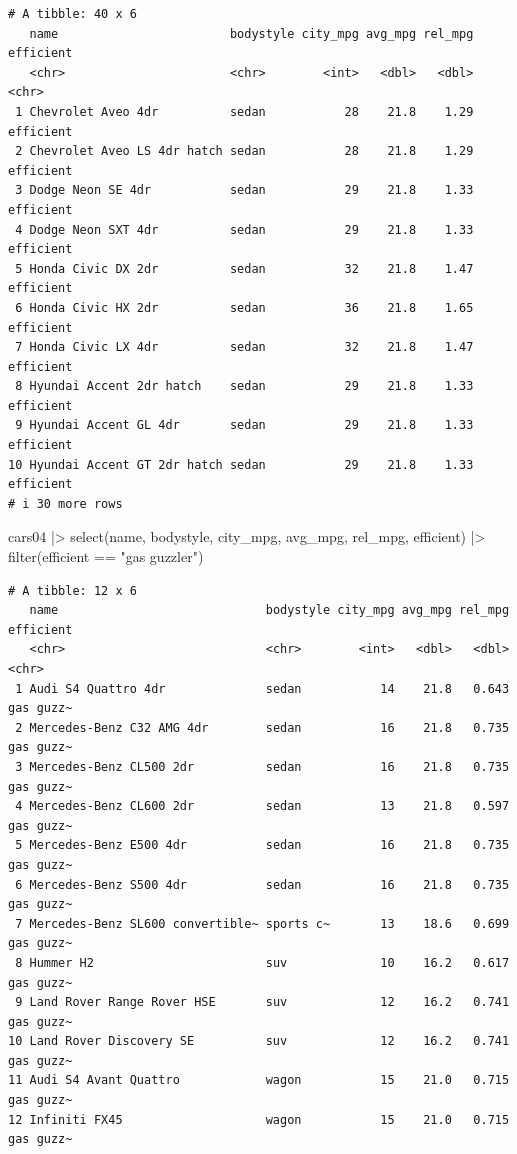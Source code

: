 \documentclass[
  letterpaper,
]{book}
\newenvironment{Shaded}{\begin{snugshade}}{\end{snugshade}}
\newcommand{\FunctionTok}[1]{\textcolor[rgb]{0.28,0.35,0.67}{#1}}
\newcommand{\NormalTok}[1]{\textcolor[rgb]{0.00,0.23,0.31}{#1}}
\newcommand{\SpecialCharTok}[1]{\textcolor[rgb]{0.37,0.37,0.37}{#1}}
\newcommand{\StringTok}[1]{\textcolor[rgb]{0.13,0.47,0.30}{#1}}
\begin{document}
\begin{verbatim}
# A tibble: 40 x 6
   name                        bodystyle city_mpg avg_mpg rel_mpg efficient
   <chr>                       <chr>        <int>   <dbl>   <dbl> <chr>    
 1 Chevrolet Aveo 4dr          sedan           28    21.8    1.29 efficient
 2 Chevrolet Aveo LS 4dr hatch sedan           28    21.8    1.29 efficient
 3 Dodge Neon SE 4dr           sedan           29    21.8    1.33 efficient
 4 Dodge Neon SXT 4dr          sedan           29    21.8    1.33 efficient
 5 Honda Civic DX 2dr          sedan           32    21.8    1.47 efficient
 6 Honda Civic HX 2dr          sedan           36    21.8    1.65 efficient
 7 Honda Civic LX 4dr          sedan           32    21.8    1.47 efficient
 8 Hyundai Accent 2dr hatch    sedan           29    21.8    1.33 efficient
 9 Hyundai Accent GL 4dr       sedan           29    21.8    1.33 efficient
10 Hyundai Accent GT 2dr hatch sedan           29    21.8    1.33 efficient
# i 30 more rows
\end{verbatim}

\begin{Shaded}
\begin{Highlighting}[]
\NormalTok{cars04 }\SpecialCharTok{|\textgreater{}} 
  \FunctionTok{select}\NormalTok{(name, bodystyle, city\_mpg, avg\_mpg, rel\_mpg, efficient) }\SpecialCharTok{|\textgreater{}} 
  \FunctionTok{filter}\NormalTok{(efficient }\SpecialCharTok{==} \StringTok{"gas guzzler"}\NormalTok{)}
\end{Highlighting}
\end{Shaded}

\begin{verbatim}
# A tibble: 12 x 6
   name                             bodystyle city_mpg avg_mpg rel_mpg efficient
   <chr>                            <chr>        <int>   <dbl>   <dbl> <chr>    
 1 Audi S4 Quattro 4dr              sedan           14    21.8   0.643 gas guzz~
 2 Mercedes-Benz C32 AMG 4dr        sedan           16    21.8   0.735 gas guzz~
 3 Mercedes-Benz CL500 2dr          sedan           16    21.8   0.735 gas guzz~
 4 Mercedes-Benz CL600 2dr          sedan           13    21.8   0.597 gas guzz~
 5 Mercedes-Benz E500 4dr           sedan           16    21.8   0.735 gas guzz~
 6 Mercedes-Benz S500 4dr           sedan           16    21.8   0.735 gas guzz~
 7 Mercedes-Benz SL600 convertible~ sports c~       13    18.6   0.699 gas guzz~
 8 Hummer H2                        suv             10    16.2   0.617 gas guzz~
 9 Land Rover Range Rover HSE       suv             12    16.2   0.741 gas guzz~
10 Land Rover Discovery SE          suv             12    16.2   0.741 gas guzz~
11 Audi S4 Avant Quattro            wagon           15    21.0   0.715 gas guzz~
12 Infiniti FX45                    wagon           15    21.0   0.715 gas guzz~
\end{verbatim}
\end{document}
